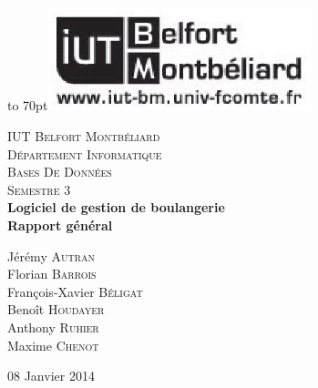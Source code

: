 \documentclass[12pt]{report}
\begin{document}
{
\begin{titlepage}

\vbox to 70pt{\hfill\includegraphics[height=3cm]{images/logo-iut.eps}}\
\begin{center}

\textsc{\LARGE IUT Belfort Montbéliard}\\[0.7cm]
\textsc{\LARGE Département Informatique}\\[1.0cm]
\textsc{\Large Bases De Données}\\[0.5cm]
\textsc{\Large Semestre 3}\\[5cm]


{ \huge \bfseries Logiciel de gestion de boulangerie}\\[0.5cm]
{ \huge \bfseries Rapport général}\\[5cm]

\begin{large}
Jérémy \textsc{Autran}\\[0.3em]
Florian \textsc{Barrois}\\[0.3em]
François-Xavier \textsc{Béligat}\\[0.3em]
Benoît \textsc{Houdayer}\\[0.3em]
Anthony \textsc{Ruhier}\\[0.3em]
Maxime \textsc{Chenot}\\[0.3em]

\end{large}

\vfill

{\large 08 Janvier 2014}

\end{center}
\end{titlepage}
}

{\clearpage\mbox{}\thispagestyle{empty}\clearpage}
\setcounter{page}{1}
%
{\large{}}












\tableofcontents
{}

%
%
\end{document}
